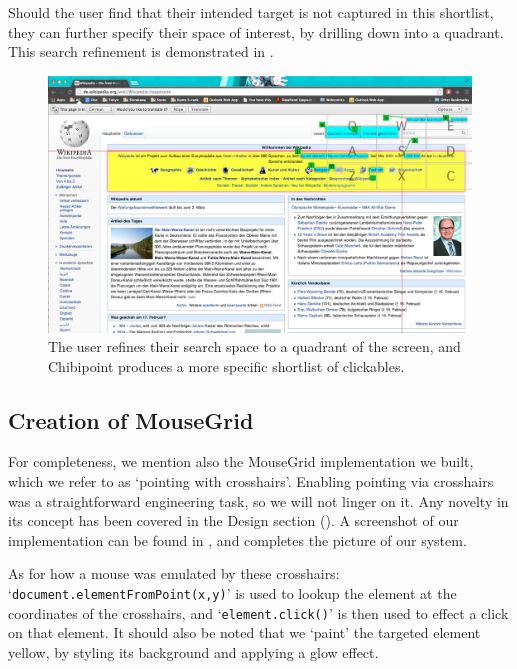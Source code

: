 \documentclass[11pt,openright,a4paper]{report}
\begin{document}
Should the user find that their intended target is not captured in this shortlist, they can further specify their space of interest, by drilling down into a quadrant. This search refinement is demonstrated in .

\begin{figure}[ht]
\centering\includegraphics[width=\textwidth]{figures/FlyoutsFilteredOriginal.png}
\caption{The user refines their search space to a quadrant of the screen, and Chibipoint produces a more specific shortlist of clickables.}
\label{fig:impFilteredClickable}
\end{figure}

\FloatBarrier

\subsection{Creation of MouseGrid}
For completeness, we mention also the MouseGrid implementation we built, which we refer to as `pointing with crosshairs'. Enabling pointing via crosshairs was a straightforward engineering task, so we will not linger on it. Any novelty in its concept has been covered in the Design section (). A screenshot of our implementation can be found in , and completes the picture of our system.

As for how a mouse was emulated by these crosshairs: `\texttt{document.elementFromPoint(x,y)}' is used to lookup the element at the coordinates of the crosshairs, and `\texttt{element.click()}' is then used to effect a click on that element. It should also be noted that we `paint' the targeted element yellow, by styling its background and applying a glow effect.
\end{document}
